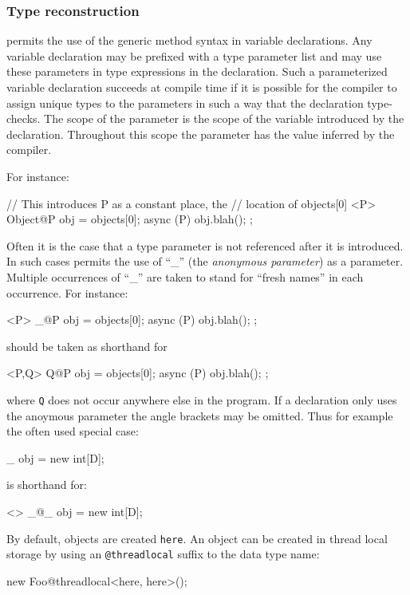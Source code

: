 \subsubsection{Type reconstruction}

{}\Xten{} permits the use of the generic method syntax in variable
declarations. Any variable declaration may be prefixed with a type
parameter list and may use these parameters in type expressions in the
declaration. Such a parameterized variable declaration succeeds at
compile time if it is possible for the compiler to assign unique types
to the parameters in such a way that the declaration type-checks.  The
scope of the parameter is the scope of the variable introduced by the
declaration. Throughout this scope the parameter has the value
inferred by the compiler.

For instance:
\begin{x10}
  // This introduces P as a constant place, the
  // location of objects[0]
 <P> Object@P obj = objects[0];
 async (P) { obj.blah(); };
\end{x10}

Often it is the case that a type parameter is not referenced after it
is introduced. In such cases \Xten{} permits the use of ``\_'' (the
{\em anonymous
parameter})\label{AnonymousParameter}
as a parameter. Multiple occurrences of ``\_'' are taken to stand for
``fresh names'' in each occurrence.  For instance:
\begin{x10}
 <P> \_@P obj = objects[0];
 async (P) { obj.blah(); };
\end{x10}
\noindent should be taken as shorthand for
\begin{x10}
 <P,Q> Q@P obj = objects[0];
 async (P) { obj.blah(); };
\end{x10}
{}\noindent where {\tt Q} does not occur anywhere else in the
program. If a declaration only uses the anoymous parameter the angle
brackets may be omitted. Thus for example the often used special case:
\begin{x10}
  \_ obj = new int[D];
\end{x10}
\noindent is shorthand for:
\begin{x10}
  <> \_@\_ obj = new int[D];
\end{x10}

{}\noindent By default, objects are created {\tt here}. An object can
be created in thread local storage by using an {\tt @threadlocal}
suffix to the data type name:
\begin{x10}
   new Foo@threadlocal<here, here>();
\end{x10}


